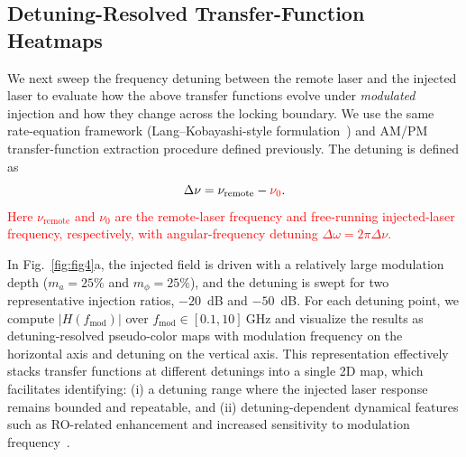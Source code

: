 \documentclass[%
 aip,
 apl,
 amsmath,amssymb,
 reprint,%
 floatfix,
]{revtex4-1}
\begin{document}
\subsection{Detuning-Resolved Transfer-Function Heatmaps}

We next sweep the frequency detuning between the remote laser and the injected laser to evaluate how the above transfer functions evolve under \emph{modulated} injection and how they change across the locking boundary. We use the same rate-equation framework (Lang--Kobayashi-style formulation~\cite{Fragkos2012JLT_AmpLimiter_OIL}) and AM/PM transfer-function extraction procedure defined previously. The detuning is defined as
\begin{equation}
\Delta\nu = \nu_{\mathrm{remote}} - \textcolor{red}{\nu_0}.
\end{equation}
\textcolor{red}{Here $\nu_{\mathrm{remote}}$ and $\nu_0$ are the remote-laser frequency and free-running injected-laser frequency, respectively, with angular-frequency detuning $\Delta\omega=2\pi\Delta\nu$.}

In Fig.~\ref{fig:fig4}a, the injected field is driven with a relatively large modulation depth ($m_a=25\%$ and $m_\phi=25\%$), and the detuning is swept for two representative injection ratios, $-20$~dB and $-50$~dB. For each detuning point, we compute $|H(f_{\text{mod}})|$ over $f_{\text{mod}}\in[0.1,10]\ \text{GHz}$ and visualize the results as detuning-resolved pseudo-color maps with modulation frequency on the horizontal axis and detuning on the vertical axis. This representation effectively stacks transfer functions at different detunings into a single 2D map, which facilitates identifying: (i) a detuning range where the injected laser response remains bounded and repeatable, and (ii) detuning-dependent dynamical features such as RO-related enhancement and increased sensitivity to modulation frequency~\cite{Lau2008JQE_FreqRespEnh_OIL,Lau2008JLT_MasterModulation_OIL_BWEnhancement}.
\end{document}
